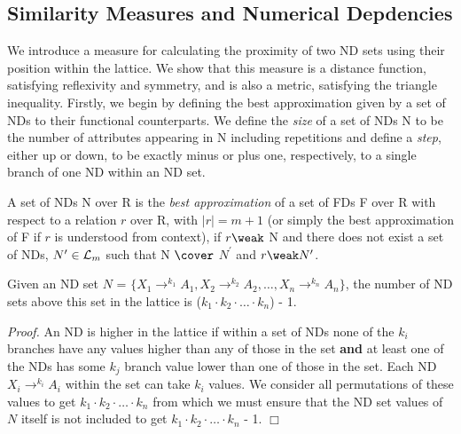 \subsection{Similarity Measures and Numerical Depdencies}


We introduce a measure for calculating the proximity of two ND sets using
their position within the lattice.  We show that this measure is a distance
function, satisfying reflexivity and symmetry, and is also a metric, 
satisfying the triangle inequality. Firstly, we begin by defining the best
approximation given by a set of NDs to their functional counterparts.
We define the {\em size} of a set of NDs N to be the number of attributes 
appearing in N including repetitions and define a {\em step}, either up
or down, to be exactly minus or plus one, respectively, to a single branch of
one ND within an ND set. 

\begin{definition}\label{def:best}
\begin{rm}
A set of NDs N over R is the {\em best approximation} of 
a set of FDs F over R with respect to a relation $r$ over R,
with $\mid r \mid = m+1$ (or simply the best approximation of F
if $r$ is understood from context), if $r \weak$ N 
and there does not exist a set of NDs, $N^\prime \in {\cal L}_m$
such that N $\cover$ $N^\prime$ and $r \weak N^\prime$.
\end{rm}
\end{definition}



\begin{proposition}
\begin{rm}
Given an ND set $N$ = \linebreak[4]   $\{ X_1 \to^{k_1} A_1, X_2 \to^{k_2} A_2,
 \ldots, X_n \to^{k_n} A_n \}$, the number of ND sets above this set in the
lattice is ($k_1 \cdot k_2 \cdot \ldots \cdot k_n$) - 1.
\end{rm}
\end{proposition}

{\em Proof.} An ND is higher in the lattice if within a 
set of NDs none of the $k_i$ branches have any values higher than
any of those in the set {\bf and} at least one of the NDs has some 
$k_j$ branch value
lower than one of those in the set. Each ND $X_i \to^{k_i} A_i$ within
the set can take $k_i$ values. We consider all permutations of these
values to get $k_1 \cdot k_2 \cdot \ldots \cdot k_n$ from which we 
must ensure that the ND set values of $N$ itself is not included to get
$k_1 \cdot k_2 \cdot \ldots \cdot k_n$ - 1. $\Box$

